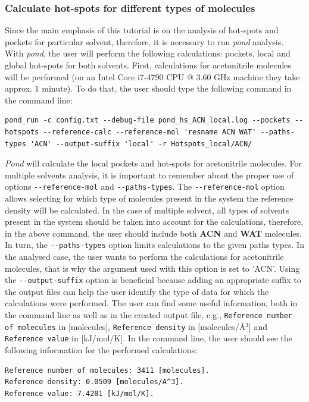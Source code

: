 \documentclass[9pt,tutorial, pubversion]{livecoms}
\begin{document}
\subsubsection{Calculate hot-spots for different types of molecules}
Since the main emphasis of this tutorial is on the analysis of hot-spots and pockets for particular solvent, therefore, it is necessary to run \emph{pond} analysis. With \emph{pond}, the user will perform the following calculations: pockets, local and global hot-spots for both solvents. First, calculations for acetonitrile molecules will be performed (on an Intel Core i7-4790 CPU @ 3.60 GHz machine they take approx. 1 minute). To do that, the user should type the following command in the command line:
\begin{lstlisting}
pond_run -c config.txt --debug-file pond_hs_ACN_local.log --pockets --hotspots --reference-calc --reference-mol 'resname ACN WAT' --paths-types 'ACN' --output-suffix 'local' -r Hotspots_local/ACN/ 
\end{lstlisting}
\emph{Pond} will calculate the local pockets and hot-spots for acetonitrile molecules. For multiple solvents analysis, it is important to remember about the proper use of options \texttt{-{}-reference-mol} and \texttt{-{}-paths-types}. The \texttt{-{}-reference-mol} option allows selecting for which type of molecules present in the system the reference density will be calculated. In the case of multiple solvent, all types of solvents present in the system should be taken into account for the calculations, therefore, in the above command, the user should include both \textbf{ACN} and \textbf{WAT} molecules. In turn, the \texttt{-{}-paths-types} option limits calculations to the given paths types. In the analysed case, the user wants to perform the calculations for acetonitrile molecules, that is why the argument used with this option is set to 'ACN'. Using the \texttt{-{}-output-suffix} option is beneficial because adding an appropriate suffix to the output files can help the user identify the type of data for which the calculations were performed. 
The user can find some useful information, both in the command line as well as in the created output file, e.g., \texttt{Reference number of molecules} in [molecules], \texttt{Reference density} in [molecules/Å\( \displaystyle ^{3}\)] and \texttt{Reference value} in [kJ/mol/K]. In the command line, the user should see the following information for the performed calculations: 
\begin{lstlisting}[columns=fullflexible]
Reference number of molecules: 3411 [molecules].
Reference density: 0.0509 [molecules/A^3].
Reference value: 7.4281 [kJ/mol/K].
\end{lstlisting}
\end{document}
